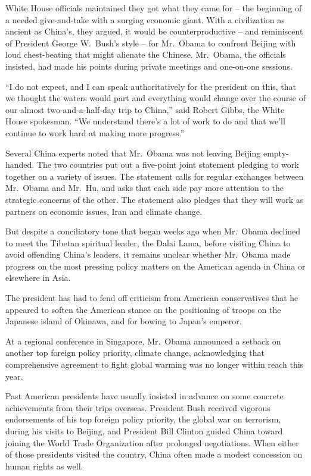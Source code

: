 ﻿\documentclass[12pt]{article}
\begin{document}
White House officials maintained they got what they came for -- the beginning of a needed
give-and-take with a surging economic giant. With a civilization as ancient as China's, they argued,
it would be counterproductive -- and reminiscent of President George W.~Bush's style -- for
Mr.~Obama to confront Beijing with loud chest-beating that might alienate the Chinese. Mr.~Obama,
the officials insisted, had made his points during private meetings and one-on-one sessions.

``I do not expect, and I can speak authoritatively for the president on this, that we thought the
waters would part and everything would change over the course of our almost two-and-a-half-day trip
to China,'' said Robert Gibbs, the White House spokesman. ``We understand there's a lot of work to
do and that we'll continue to work hard at making more progress.''

Several China experts noted that Mr.~Obama was not leaving Beijing empty-handed. The two countries
put out a five-point joint statement pledging to work together on a variety of issues. The statement
calls for regular exchanges between Mr.~Obama and Mr.~Hu, and asks that each side pay more attention
to the strategic concerns of the other. The statement also pledges that they will work as partners
on economic issues, Iran and climate change.

But despite a conciliatory tone that began weeks ago when Mr.~Obama declined to meet the Tibetan
spiritual leader, the Dalai Lama, before visiting China to avoid offending China's leaders, it
remains unclear whether Mr.~Obama made progress on the most pressing policy matters on the American
agenda in China or elsewhere in Asia.

The president has had to fend off criticism from American conservatives that he appeared to soften
the American stance on the positioning of troops on the Japanese island of Okinawa, and for bowing
to Japan's emperor.

At a regional conference in Singapore, Mr.~Obama announced a setback on another top foreign policy
priority, climate change, acknowledging that comprehensive agreement to fight global warming was no
longer within reach this year.

Past American presidents have usually insisted in advance on some concrete achievements from their
trips overseas. President Bush received vigorous endorsements of his top foreign policy priority,
the global war on terrorism, during his visits to Beijing, and President Bill Clinton guided China
toward joining the World Trade Organization after prolonged negotiations. When either of those
presidents visited the country, China often made a modest concession on human rights as well.
\end{document}
